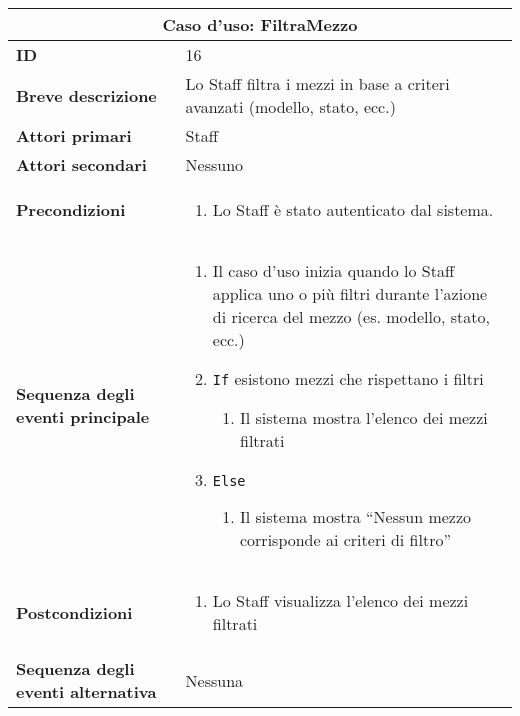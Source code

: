 \documentclass[a4paper]{report}
\begin{document}
\clearpage
\begin{table}[H]
\vspace*{-0cm}
\renewcommand{\arraystretch}{1.9}
\begin{tabular}{|p{3.9cm}|p{9.9cm}|}
\hline
\multicolumn{2}{|c|}{\textbf{Caso d’uso: FiltraMezzo}} \\ \hline
	\textbf{ID} & 16 \\ \hline
	\textbf{Breve descrizione} & Lo Staff filtra i mezzi in base a criteri avanzati (modello, stato, ecc.) \\ \hline
	\textbf{Attori primari} & Staff \\ \hline
	\textbf{Attori secondari} & Nessuno \\ \hline
	\textbf{Precondizioni} & \begin{enumerate}[label=\arabic*.,leftmargin=14pt,labelsep=0.5em,topsep=0pt,partopsep=0pt,parsep=0pt,itemsep=0pt]
        \item Lo Staff è stato autenticato dal sistema.
    \end{enumerate} \\ \hline
	\textbf{Sequenza degli eventi principale} & 
\begin{enumerate}[leftmargin=14pt,label=\arabic*.,labelsep=0.5em,topsep=0pt,partopsep=0pt,parsep=0pt,itemsep=0pt]
    \item Il caso d'uso inizia quando lo Staff applica uno o più filtri durante l'azione di ricerca del mezzo (es. modello, stato, ecc.)
    \item \texttt{If} esistono mezzi che rispettano i filtri
    \begin{enumerate}[label=\arabic{enumi}.\arabic*.,leftmargin=22pt,labelsep=0.5em,topsep=0pt,partopsep=0pt,parsep=0pt,itemsep=0pt]
        \item Il sistema mostra l’elenco dei mezzi filtrati
    \end{enumerate}
    \item \texttt{Else}
    \begin{enumerate}[label=\arabic{enumi}.\arabic*.,leftmargin=22pt,labelsep=0.5em,topsep=0pt,partopsep=0pt,parsep=0pt,itemsep=0pt]
        \item Il sistema mostra “Nessun mezzo corrisponde ai criteri di filtro”
    \end{enumerate}
\end{enumerate}\\ \hline
    	\textbf{Postcondizioni} & \begin{enumerate}[label=\arabic*.,leftmargin=14pt,labelsep=0.5em,topsep=0pt,partopsep=0pt,parsep=0pt,itemsep=0pt]
        \item Lo Staff visualizza l’elenco dei mezzi filtrati
        \end{enumerate} \\ \hline
    	\textbf{Sequenza degli eventi alternativa} & Nessuna \\ \hline
\end{tabular}
\end{table}
\end{document}
